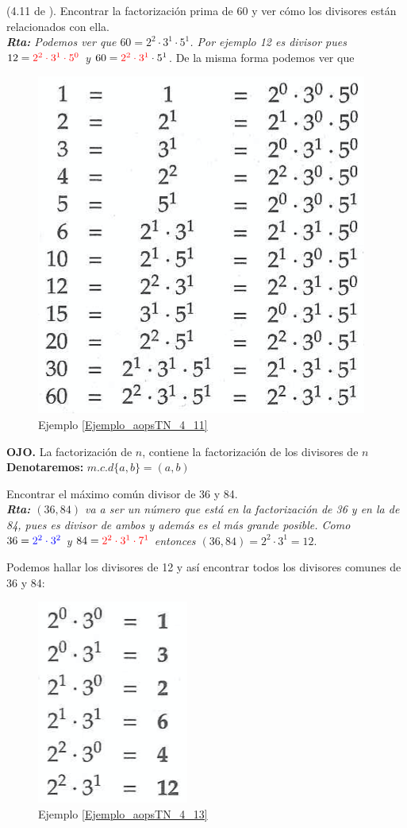 \begin{ejemplo}\label{Ejemplo_aopsTN_4_11}
	(4.11 de \cite{Aops_TN}). Encontrar la factorización prima de 60 y ver cómo los divisores están relacionados con ella. \\
	\textit{\textbf{Rta:} Podemos ver que $60=2^2\cdot3^1\cdot 5^1$. Por ejemplo 12 es divisor pues $12=\color{red}2^2\cdot 3^1\cdot 5^0$ y $60=\color{red}2^2\cdot 3^1\color{black} \cdot 5^1$}. De la misma forma podemos ver que
		\begin{figure}[H]
			\centering
			\includegraphics[width=0.35\linewidth]{TN/imgs/4_11_aops_tn}
			\caption{Ejemplo \ref{Ejemplo_aopsTN_4_11}}
			\label{4_11_aops_tn}
		\end{figure}
\end{ejemplo}

\textbf{OJO. }La factorización de $n$, contiene la factorización de los divisores de $n$\\
\textbf{Denotaremos: }$m.c.d\{a,b\}=(a,b)$\\

\begin{ejemplo}\label{Ejemplo_aopsTN_4_13}
	Encontrar el máximo  común divisor de 36 y 84. \\
	\textit{\textbf{Rta:} $(36,84)$ va a ser un número que está en la factorización de 36 y en la de 84, pues es divisor de ambos y además es el más grande posible. Como $36=\color{blue}2^2\cdot 3^2$ y $84=\color{red}2^2\cdot 3^1\cdot 7^1$ entonces $(36,84)= 2^2\cdot3^1 =12$}.
	
	Podemos hallar los divisores de 12 y así encontrar todos los divisores comunes de 36 y 84:
	\begin{figure}[H]
		\centering
		\includegraphics[width=0.2\linewidth]{TN/imgs/4_13_aops_tn}
		\caption{Ejemplo \ref{Ejemplo_aopsTN_4_13}}
		\label{4_13_aops_tn}
	\end{figure}
\end{ejemplo}

